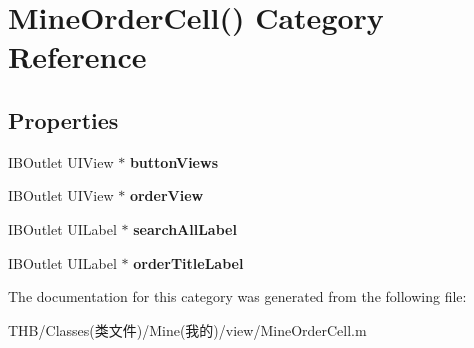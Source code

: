 \hypertarget{category_mine_order_cell_07_08}{}\section{Mine\+Order\+Cell() Category Reference}
\label{category_mine_order_cell_07_08}
\subsection*{Properties}
\begin{DoxyCompactItemize}
\item 
\mbox{\label{category_mine_order_cell_07_08_a3bdca34ba436fa6f4767675f4d5f9f49}} 
I\+B\+Outlet U\+I\+View $\ast$ {\bfseries button\+Views}
\item 
\mbox{\label{category_mine_order_cell_07_08_af84c69eb307407ac07ec3bf24df0b736}} 
I\+B\+Outlet U\+I\+View $\ast$ {\bfseries order\+View}
\item 
\mbox{\label{category_mine_order_cell_07_08_a342448f3bbe3037b2d88141300525082}} 
I\+B\+Outlet U\+I\+Label $\ast$ {\bfseries search\+All\+Label}
\item 
\mbox{\label{category_mine_order_cell_07_08_a110fafd9fe1e64a8e5b6803981595336}} 
I\+B\+Outlet U\+I\+Label $\ast$ {\bfseries order\+Title\+Label}
\end{DoxyCompactItemize}


The documentation for this category was generated from the following file\+:\begin{DoxyCompactItemize}
\item 
T\+H\+B/\+Classes(类文件)/\+Mine(我的)/view/Mine\+Order\+Cell.\+m\end{DoxyCompactItemize}

